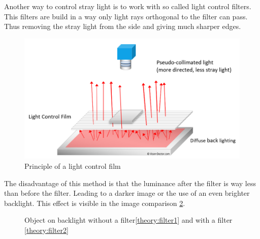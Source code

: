 Another way to control stray light is to work with so called light control filters. This filters are build in a way only light rays orthogonal to the filter can pass. Thus removing the stray light from the side and giving much sharper edges.\\
\begin{figure}[ht]
	\includegraphics[width=\linewidth]{2-theory/backlight/Light_Control_Film_principle.png}
	\caption{Principle of a light control film\label{theory:filter}}	
\end{figure}


The disadvantage of this method is that the luminance after the filter is way less than before the filter. Leading to a darker image or the use of an even brighter backlight. This effect is visible in the image comparison \ref{theory:filtercompare}.
\begin{figure}[ht]
	\caption{Object on backlight without a filter\ref{theory:filter1} and with a filter \ref{theory:filter2} \label{theory:filtercompare}}	
\end{figure}
\\


